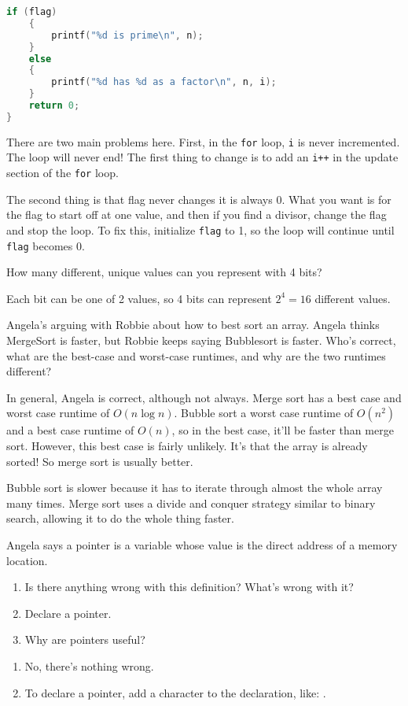 \documentclass[12pt]{exam}
\begin{document}
\begin{questions}
\begin{lstlisting}[language=c, mathescape]
    if (flag)
    {
        printf("%d is prime\n", n);
    }
    else
    {    
        printf("%d has %d as a factor\n", n, i);
    }
    return 0;
}
\end{lstlisting}

There are two main problems here.
First, in the {\tt for} loop, {\tt i} is never incremented.
The loop will never end!
The first thing to change is to add an {\tt i++} in the update section of the {\tt for} loop.

The second thing is that flag never changes it is always 0.
What you want is for the flag to start off at one value, and then if you find a divisor, change the flag and stop the loop.
To fix this, initialize {\tt flag} to 1, so the loop will continue until {\tt flag} becomes 0.

\question
How many different, unique values can you represent with 4 bits?

Each bit can be one of 2 values, so 4 bits can represent $2^4 = 16$ different values.

\question 
Angela's arguing with Robbie about how to best sort an array. Angela thinks MergeSort is faster, but Robbie keeps saying Bubblesort is faster. Who's correct, what are the best-case and worst-case runtimes, and why are the two runtimes different?

In general, Angela is correct, although not always.
Merge sort has a best case and worst case runtime of $O(n \log{n})$.
Bubble sort a worst case runtime of $O(n^2)$ and a best case runtime of $O(n)$, so in the best case, it'll be faster than merge sort.
However, this best case is fairly unlikely.
It's that the array is already sorted!
So merge sort is usually better.

Bubble sort is slower because it has to iterate through almost the whole array many times.
Merge sort uses a divide and conquer strategy similar to binary search, allowing it to do the whole thing faster.

\question
Angela says a pointer is a variable whose value is the direct address of a memory location. 
\begin{enumerate}
\item Is there anything wrong with this definition? What's wrong with it?
\item Declare a pointer.
\item Why are pointers useful?
\end{enumerate}
 
\begin{enumerate}
\item No, there's nothing wrong.
\item To declare a pointer, add a {\tt *} character to the declaration, like: .
\end{enumerate}



\end{questions}
\end{document}
